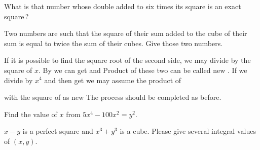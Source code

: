 \documentclass[]{article}
\begin{document}
{What is that number whose double added to six times its square is an
exact square\,?}

\begin{quote}  {
}  \end{quote}

{Two numbers are such that the square of their sum added to the cube of
their sum is equal to twice the sum of their cubes. Give those two
numbers.}

\begin{quote}  {
}  \end{quote}

If it is possible to find the square root of the second side, we may
divide by the square of $x$. By {} we can get {} and {}
Product of these two can be called new {}. If we divide by $x^{4}$
and then get {} we may assume the product of 
\newpage
\large

 with
the square of {} as new {} The process should be
completed as before.

\begin{quote}  {
}  \end{quote}

Find the value of $x$ from $5x^{4} - 100x^{2} = y^{2}$.

\begin{quote}  {
}  \end{quote}

$x - y$ is a perfect square and $x^{3} + y^{3}$ is a cube. Please give
several integral values of $(x, y)$.
\end{document}

